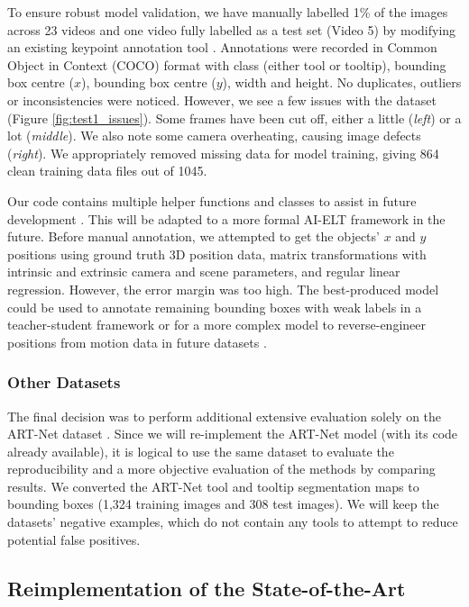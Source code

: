 To ensure robust model validation, we have manually labelled 1\% of the images across 23 videos and one video fully labelled as a test set (Video 5) by modifying an existing keypoint annotation tool \cite{herrera_luiscarlosgphkeypoint-annotation-tool_2024}. Annotations were recorded in Common Object in Context (COCO) format with class (either tool or tooltip), bounding box centre ($x$), bounding box centre ($y$), width and height. No duplicates, outliers or inconsistencies were noticed. However, we see a few issues with the dataset (Figure \ref{fig:test1_issues}). Some frames have been cut off, either a little (\textit{left}) or a lot (\textit{middle}). We also note some camera overheating, causing image defects (\textit{right}). We appropriately removed missing data for model training, giving 864 clean training data files out of 1045.

Our code contains multiple helper functions and classes to assist in future development \cite{choudhry_omarioscmsc-surgical-tool-tracking_2024}. This will be adapted to a more formal AI-ELT framework in the future. Before manual annotation, we attempted to get the objects' $x$ and $y$ positions using ground truth 3D position data, matrix transformations with intrinsic and extrinsic camera and scene parameters, and regular linear regression. However, the error margin was too high. The best-produced model could be used to annotate remaining bounding boxes with weak labels in a teacher-student framework or for a more complex model to reverse-engineer positions from motion data in future datasets \cite{teevno_semi-supervised_2023}.

\subsubsection{Other Datasets}

The final decision was to perform additional extensive evaluation solely on the ART-Net dataset \cite{hasan_detection_2021}. Since we will re-implement the ART-Net model (with its code already available), it is logical to use the same dataset to evaluate the reproducibility and a more objective evaluation of the methods by comparing results. We converted the ART-Net tool and tooltip segmentation maps to bounding boxes (1,324 training images and 308 test images). We will keep the datasets' negative examples, which do not contain any tools to attempt to reduce potential false positives.

\subsection{Reimplementation of the State-of-the-Art}

